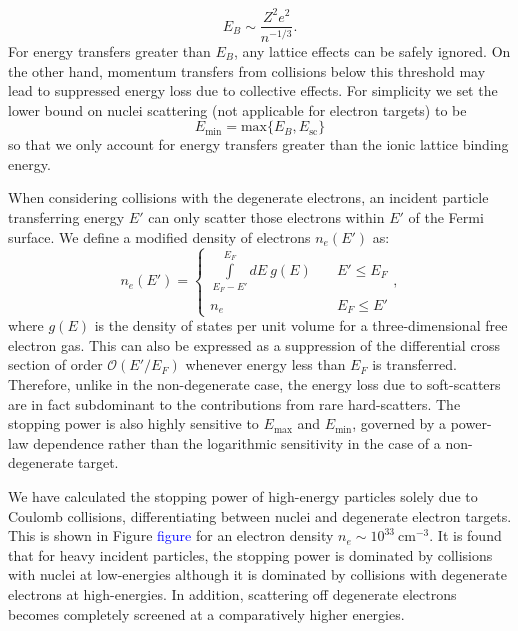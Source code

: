 \documentclass[11 pt,preprint,preprintnumbers,amsmath,amssymb, prd]{revtex4}
\begin{document}
\begin{equation}
E_B \sim \frac{Z^2 e^2}{n^{-1/3}}.
\end{equation}
For energy transfers greater than $E_B$, any lattice effects can be safely ignored. On the other hand, momentum transfers from collisions below this threshold may lead to suppressed energy loss due to collective effects. For simplicity we set the lower bound on nuclei scattering (not applicable for electron targets) to be
\begin{equation}
E_{\text{min}} = \text{max} \{E_B,E_{\text{sc}}\}
\end{equation}
so that we only account for energy transfers greater than the ionic lattice binding energy.

When considering collisions with the degenerate electrons, an incident particle transferring energy $E'$ can only scatter those electrons within $E'$ of the Fermi surface. We define a modified density of electrons $n_e(E')$ as:
\begin{equation}
n_e(E') = \left\{
        \begin{array}{ll}
            \displaystyle \int \limits_{E_F -E'}^{E_F}dE ~g(E) & \quad E' \leq E_F \\
            n_e & \quad E_F \leq E'
        \end{array}
    \right.,
\end{equation}
where $g(E)$ is the density of states per unit volume for a three-dimensional free electron gas. This can also be expressed as a suppression of the differential cross section of order $\mathcal{O}(E'/E_F)$ whenever energy less than $E_F$ is transferred. Therefore, unlike in the non-degenerate case, the energy loss due to soft-scatters are in fact subdominant to the contributions from rare hard-scatters. The stopping power is also highly sensitive to $E_{\text{max}}$ and $E_{\text{min}}$, governed by a power-law dependence rather than the logarithmic sensitivity in the case of a non-degenerate target.

We have calculated the stopping power of high-energy particles solely due to Coulomb collisions, differentiating between nuclei and degenerate electron targets. This is shown in Figure \textcolor{blue}{figure} for an electron density $n_e \sim 10^{33} ~\text{cm}^{-3}$. It is found that for heavy incident particles, the stopping power is dominated by collisions with nuclei at low-energies although it is dominated by collisions with degenerate electrons at high-energies. In addition, scattering off degenerate electrons becomes completely screened at a comparatively higher energies.
\end{document}
